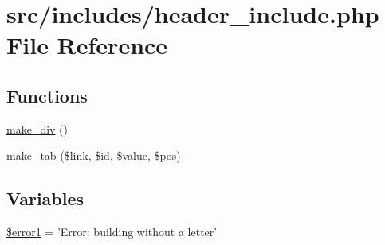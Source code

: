 \hypertarget{includes_2header__include_8php}{\section{src/includes/header\-\_\-include.php \-File \-Reference}
\label{includes_2header__include_8php}
}
\subsection*{\-Functions}
\begin{DoxyCompactItemize}
\item 
\hyperlink{includes_2header__include_8php_a9b64f1f220cc9ae86966dea20839f84f}{make\-\_\-div} ()
\item 
\hyperlink{includes_2header__include_8php_a10abcbcea4731eb8205dc4ab64940c16}{make\-\_\-tab} (\$link, \$id, \$value, \$pos)
\end{DoxyCompactItemize}
\subsection*{\-Variables}
\begin{DoxyCompactItemize}
\item 
\hyperlink{includes_2header__include_8php_a048e701cb82acbcd5a5015d63db25858}{\$error1} = '\-Error\-: building without a letter'
\end{DoxyCompactItemize}


